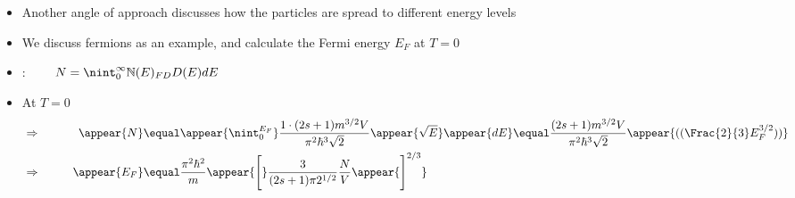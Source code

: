 \begin{frame}
\frametitle{\texorpdfstring{\culine[\sectiontitleulinecolor]{\sectiontitle}}{\sectiontitle} }

\begin{itemize}
	\item Another angle of approach discusses how the particles are spread to different energy levels 
	\item We discuss fermions as an example, and calculate the Fermi energy $E_F$ at $T=0$

\item {}: $\qquad N=\nint_{0}^{\infty}  \mathbb{N} (E)_{F D} D(E) d E$

\item At $T=0$   
\[ 
\begin{aligned} 
&\Rightarrow& \qquad \appear{N}  &\equal  \appear{\nint_{0}^{E_{F}}} \frac{1\cdot (2 s+1) m^{3 / 2} V}{\pi^{2} \hbar^{3} \sqrt{2}} \appear{\sqrt{E}} \appear{d E}  \equal  \frac{(2 s+1) m^{3 / 2} V}{\pi^{2} \hbar^{3} \sqrt{2}} \appear{\textrm{((} \Frac{2}{3} E_{F}^{3 / 2} \textrm{))}} \\ 
&\Rightarrow& \qquad \appear{E_{F}}  &\equal \frac{\pi^{2} \hbar^{2}}{m} \appear{\Bigg[}\frac{3}{(2 s+1) \pi 2^{1/2}} \frac{N}{V} \appear{\Bigg]^{2 / 3}}
\end{aligned} 
\]
\end{itemize}

\endofslide 
\end{frame}

